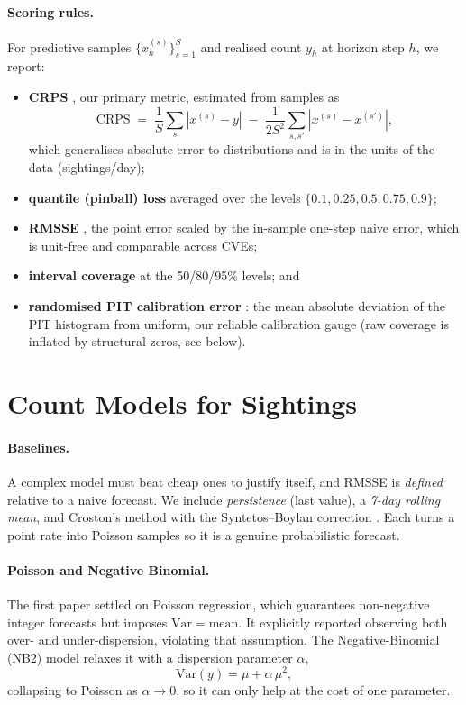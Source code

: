 \documentclass[]{article}
\begin{document}
\paragraph{Scoring rules.} For predictive samples $\{x^{(s)}_h\}_{s=1}^{S}$ and
realised count $y_h$ at horizon step $h$, we report:
\begin{itemize}
  \item \textbf{CRPS} \cite{gneiting2007strictly}, our primary metric, estimated
  from samples as
  \begin{equation}
    \mathrm{CRPS} \;=\; \frac{1}{S}\sum_{s} |x^{(s)}-y| \;-\; \frac{1}{2S^2}\sum_{s,s'} |x^{(s)}-x^{(s')}|,
  \end{equation}
  which generalises absolute error to distributions and is in the units of the
  data (sightings/day);
  \item \textbf{quantile (pinball) loss} averaged over the levels
  $\{0.1, 0.25, 0.5, 0.75, 0.9\}$;
  \item \textbf{RMSSE} \cite{makridakis2022m5}, the point error scaled by the
  in-sample one-step naive error, which is unit-free and comparable across CVEs;
  \item \textbf{interval coverage} at the 50/80/95\% levels; and
  \item \textbf{randomised PIT calibration error} \cite{czado2009predictive}: the
  mean absolute deviation of the PIT histogram from uniform, our reliable
  calibration gauge (raw coverage is inflated by structural zeros, see below).
\end{itemize}

\section{Count Models for Sightings}\label{sec:models}
\paragraph{Baselines.} A complex model must beat cheap ones to justify itself, and
RMSSE is \emph{defined} relative to a naive forecast. We include
\emph{persistence} (last value), a \emph{7-day rolling mean}, and Croston's method
with the Syntetos--Boylan correction \cite{croston1972forecasting,syntetos2005accuracy}.
Each turns a point rate into Poisson samples so it is a genuine probabilistic
forecast.

\paragraph{Poisson and Negative Binomial.} The first paper settled on Poisson
regression, which guarantees non-negative integer forecasts but imposes
$\mathrm{Var}=\mathrm{mean}$. It explicitly reported observing both over- and
under-dispersion, violating that assumption. The Negative-Binomial (NB2) model
relaxes it with a dispersion parameter $\alpha$,
\begin{equation}
  \mathrm{Var}(y) = \mu + \alpha\,\mu^2,
\end{equation}
collapsing to Poisson as $\alpha\to 0$, so it can only help at the cost of one
parameter.
\end{document}
